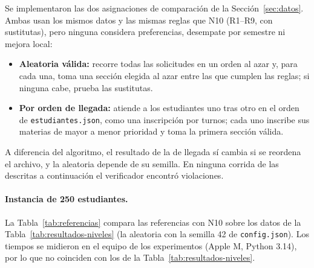 Se implementaron las dos asignaciones de comparación de la Sección~\ref{sec:datos}. Ambas usan los mismos datos y las mismas reglas que N10 (R1--R9, con sustitutas), pero ninguna considera preferencias, desempate por semestre ni mejora local:
\begin{itemize}
\item \textbf{Aleatoria válida:} recorre todas las solicitudes en un orden al azar y, para cada una, toma una sección elegida al azar entre las que cumplen las reglas; si ninguna cabe, prueba las sustitutas.
\item \textbf{Por orden de llegada:} atiende a los estudiantes uno tras otro en el orden de \texttt{estudiantes.json}, como una inscripción por turnos; cada uno inscribe sus materias de mayor a menor prioridad y toma la primera sección válida.
\end{itemize}
A diferencia del algoritmo, el resultado de la de llegada sí cambia si se reordena el archivo, y la aleatoria depende de su semilla. En ninguna corrida de las descritas a continuación el verificador encontró violaciones.

\paragraph{Instancia de 250 estudiantes.} La Tabla~\ref{tab:referencias} compara las referencias con N10 sobre los datos de la Tabla~\ref{tab:resultados-niveles} (la aleatoria con la semilla 42 de \texttt{config.json}). Los tiempos se midieron en el equipo de los experimentos (Apple M, Python 3.14), por lo que no coinciden con los de la Tabla~\ref{tab:resultados-niveles}.

\begin{tableorg}[htbp]
\centering
\caption{Asignaciones de referencia frente a N10 en la instancia de 250 estudiantes}\label{tab:referencias}
\tablebodyfont
{}
\end{tableorg}

